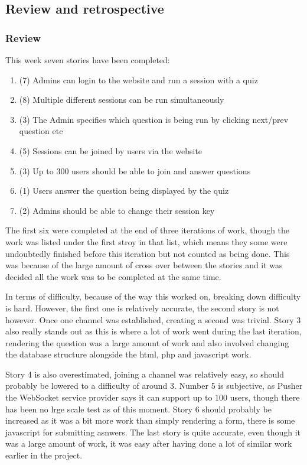 \subsection{Review and retrospective}
\subsubsection{Review}
This week seven stories have been completed:
\begin{enumerate}
	\item (7) Admins can login to the website and run a session with a quiz
	\item (8) Multiple different sessions can be run simultaneously
	\item (3) The Admin specifies which question is being run by clicking next/prev question etc
	\item (5) Sessions can be joined by users via the website
	\item (3) Up to 300 users should be able to join and answer questions
	\item (1) Users answer the question being displayed by the quiz
	\item (2) Admins should be able to change their session key
\end{enumerate}
The first six were completed at the end of three iterations of work, though the work was listed under the first stroy in that list, which means they some were undoubtedly finished before this iteration but not counted as being done. This was because of the large amount of cross over between the stories and it was decided all the work was to be completed at the same time.

In terms of difficulty, because of the way this worked on, breaking down difficulty is hard. However, the first one is relatively accurate, the second story  is not however. Once one channel was established, creating a second was trivial. Story 3 also really stands out as this is where a lot of work went during the last iteration, rendering the question was a large amount of work and also involved changing the database structure alongside the html, php and javascript work. 

Story 4 is also overestimated, joining a channel was relatively easy, so should probably be lowered to a difficulty of around 3. Number 5 is subjective, as Pusher the WebSocket service provider says it can support up to 100 users, though there has been no lrge scale test as of this moment. Story 6 should probably be increased as it was a bit more work than simply rendering a form, there is some javascript for submitting asnwers. The last story is quite accurate, even though it was a large amount of work, it was easy after having done a lot of similar work earlier in the project.

